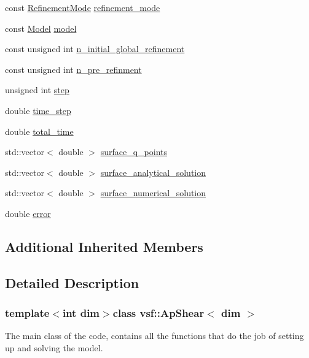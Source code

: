 \begin{DoxyCompactItemize}
\item 
const \hyperlink{classvsf_1_1ApShear_aef8049bf5f942237a19e8b88ddc19e8c}{Refinement\-Mode} \hyperlink{classvsf_1_1ApShear_a523d3e34e242a9dbcf1d727dc17874b6}{refinement\-\_\-mode}
\item 
const \hyperlink{classvsf_1_1ApShear_a354ce33d5e60761e975bdb924119354d}{Model} \hyperlink{classvsf_1_1ApShear_a3a6fb4045df9297aea20326cb0df5748}{model}
\item 
const unsigned int \hyperlink{classvsf_1_1ApShear_ab02322073eb961685e8daef27729bf8d}{n\-\_\-initial\-\_\-global\-\_\-refinement}
\item 
const unsigned int \hyperlink{classvsf_1_1ApShear_a5c702ecbc19d28d835e666c8ee87c4eb}{n\-\_\-pre\-\_\-refinment}
\item 
unsigned int \hyperlink{classvsf_1_1ApShear_aa8a20bee076f8edea5090fe587af2630}{step}
\item 
double \hyperlink{classvsf_1_1ApShear_ab11c93d8c80fc10976c8fb91a733cf92}{time\-\_\-step}
\item 
double \hyperlink{classvsf_1_1ApShear_ab4bd5313e37b8819910d35aaae0a2373}{total\-\_\-time}
\item 
std\-::vector$<$ double $>$ \hyperlink{classvsf_1_1ApShear_a9aec407d8269d51336f50f3a9d94b53b}{surface\-\_\-q\-\_\-points}
\item 
std\-::vector$<$ double $>$ \hyperlink{classvsf_1_1ApShear_a96a76f66c7155491bfe3d3c50d576fe9}{surface\-\_\-analytical\-\_\-solution}
\item 
std\-::vector$<$ double $>$ \hyperlink{classvsf_1_1ApShear_adbc4b0f8e2a3282b27241a2088f9717d}{surface\-\_\-numerical\-\_\-solution}
\item 
double \hyperlink{classvsf_1_1ApShear_a980e61d73be5cae2b8e8498b9ffc087a}{error}
\end{DoxyCompactItemize}
\subsection*{Additional Inherited Members}


\subsection{Detailed Description}
\subsubsection*{template$<$int dim$>$class vsf\-::\-Ap\-Shear$<$ dim $>$}

The main class of the code, contains all the functions that do the job of setting up and solving the model.

